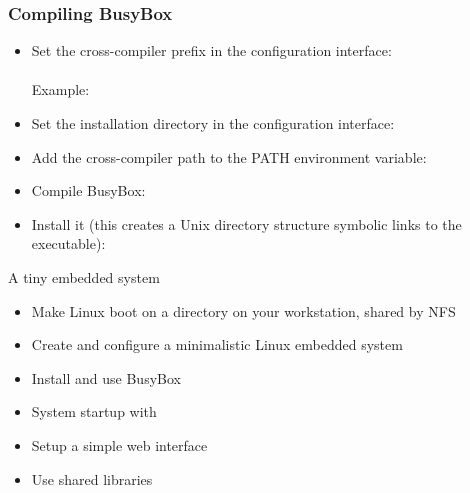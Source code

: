 \begin{frame}
  \frametitle{Compiling BusyBox}
  \begin{itemize}
  \item Set the cross-compiler prefix in the configuration interface: \\
    \\
    Example: 
  \item Set the installation directory in the configuration interface: \\
  \item Add the cross-compiler path to the PATH environment variable:\\
  \item Compile BusyBox:\\
  \item Install it (this creates a Unix directory structure symbolic
    links to the  executable):\\
  \end{itemize}
\end{frame}

\setuplabframe
{A tiny embedded system}
{
  \begin{itemize}
  \item Make Linux boot on a directory on your workstation, shared by NFS
  \item Create and configure a minimalistic Linux embedded system
  \item Install and use BusyBox
  \item System startup with 
  \item Setup a simple web interface
  \item Use shared libraries
  \end{itemize}
}
